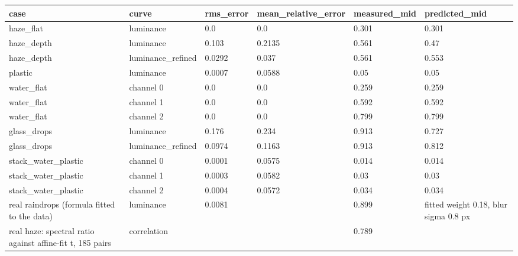 \begin{tabular}{llllll}
\toprule
case & curve & rms\_error & mean\_relative\_error & measured\_mid & predicted\_mid \\
\midrule
haze\_flat & luminance & 0.0 & 0.0 & 0.301 & 0.301 \\
haze\_depth & luminance & 0.103 & 0.2135 & 0.561 & 0.47 \\
haze\_depth & luminance\_refined & 0.0292 & 0.037 & 0.561 & 0.553 \\
plastic & luminance & 0.0007 & 0.0588 & 0.05 & 0.05 \\
water\_flat & channel 0 & 0.0 & 0.0 & 0.259 & 0.259 \\
water\_flat & channel 1 & 0.0 & 0.0 & 0.592 & 0.592 \\
water\_flat & channel 2 & 0.0 & 0.0 & 0.799 & 0.799 \\
glass\_drops & luminance & 0.176 & 0.234 & 0.913 & 0.727 \\
glass\_drops & luminance\_refined & 0.0974 & 0.1163 & 0.913 & 0.812 \\
stack\_water\_plastic & channel 0 & 0.0001 & 0.0575 & 0.014 & 0.014 \\
stack\_water\_plastic & channel 1 & 0.0003 & 0.0582 & 0.03 & 0.03 \\
stack\_water\_plastic & channel 2 & 0.0004 & 0.0572 & 0.034 & 0.034 \\
real raindrops (formula fitted to the data) & luminance & 0.0081 &  & 0.899 & fitted weight 0.18, blur sigma 0.8 px \\
real haze: spectral ratio against affine-fit t, 185 pairs & correlation &  &  & 0.789 &  \\
\bottomrule
\end{tabular}
